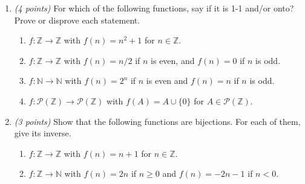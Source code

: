 \documentclass[12pt]{article}
\begin{document}
\begin{enumerate}

\item \emph{(4 points)} For which of the following functions, say if it is 1-1 and/or onto? Prove or disprove each statement.

\begin{enumerate}
\item \( f : \mathbb{Z} \to \mathbb{Z} \) with \( f(n) = n^2 + 1 \) for \( n \in \mathbb{Z} \).\newline


\item \( f : \mathbb{Z} \to \mathbb{Z} \) with \( f(n) = n/2 \) if \( n \) is even, and \( f(n) = 0 \) if \( n \) is odd. \newline


\item \( f: \mathbb{N} \to \mathbb{N} \) with \( f(n) = 2^n \) if \( n \) is even and \( f(n) = n \) if \( n \) is odd. \newline


\item \( f : \mathcal{P}(\mathbb{Z}) \to \mathcal{P}(\mathbb{Z}) \) with \( f(A) = A \cup \{ 0 \} \) for \( A \in \mathcal{P}(\mathbb{Z}) \). \newline

\end{enumerate}


\item \emph{(3 points)} Show that the following functions are bijections. For each of them, give its inverse.

\begin{enumerate}
\item \( f : \mathbb{Z} \to \mathbb{Z} \) with \( f(n) = n + 1 \) for \( n \in \mathbb{Z} \). \newline


\item \( f : \mathbb{Z} \to \mathbb{N} \) with \( f(n) = 2n \) if \( n \geq 0 \) and \( f(n) = - 2n - 1 \) if \( n < 0 \). \newline



\end{enumerate}
\end{enumerate}
\end{document}
